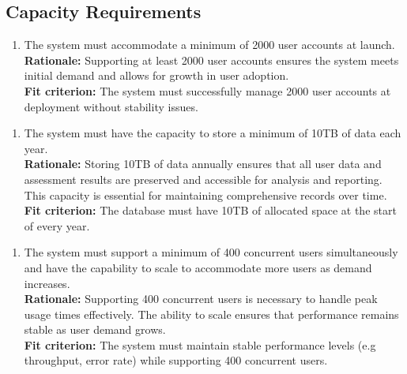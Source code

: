 \documentclass[12pt]{article}
\begin{document}
\subsection{Capacity Requirements}
\begin{enumerate}[{PR-CR}1. ]
  \item The system must accommodate a minimum of 2000 user accounts at launch.\\
  \textbf{Rationale: }Supporting at least 2000 user accounts ensures the system meets initial demand and allows for growth in user adoption.\\
  \textbf{Fit criterion: }The system must successfully manage 2000 user accounts at deployment without stability issues.  
\end{enumerate}
\begin{enumerate}[{PR-CR}2. ]
  \item The system must have the capacity to store a minimum of 10TB of data each year.\\
  \textbf{Rationale: }Storing 10TB of data annually ensures that all user data and assessment results are preserved and accessible for analysis and reporting. This capacity is essential for maintaining comprehensive records over time.\\
  \textbf{Fit criterion: }The database must have 10TB of allocated space at the start of every year.  
\end{enumerate}
\begin{enumerate}[{PR-CR}3. ]
  \item The system must support a minimum of 400 concurrent users simultaneously and have the capability to scale to accommodate more users as demand increases.\\
  \textbf{Rationale: }Supporting 400 concurrent users is necessary to handle peak usage times effectively. The ability to scale ensures that performance remains stable as user demand grows.\\
  \textbf{Fit criterion: }The system must maintain stable performance levels (e.g throughput, error rate) while supporting 400 concurrent users.  
\end{enumerate}
\end{document}
